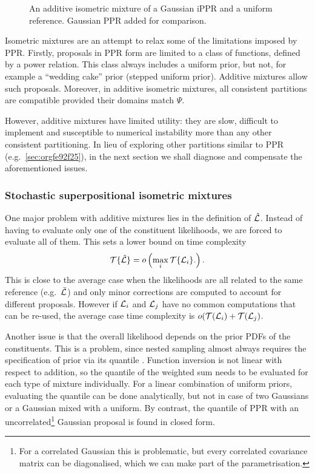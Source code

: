 \documentclass[usenatbib]{mnras}
\begin{document}
\begin{figure}
  
  \caption{\label{fig:additive} An additive isometric mixture of a
    Gaussian iPPR and a uniform reference. Gaussian PPR added for comparison.}
\end{figure}

Isometric mixtures are an attempt to relax some of the limitations
imposed by PPR. Firstly, proposals in PPR form are limited to a class
of functions, defined by a power relation. This class always includes
a uniform prior, but not, for example a ``wedding cake'' prior
(stepped uniform prior). Additive mixtures allow such
proposals. Moreover, in additive isometric mixtures, all consistent
partitions are compatible provided their domains match $\Psi$.

However, additive mixtures have limited utility: they are slow,
difficult to implement and susceptible to numerical instability more
than any other consistent partitioning. In lieu of exploring other
partitions similar to PPR (e.g.~\cref{sec:orgfe92f25}), in the next
section we shall diagnose and compensate the aforementioned issues.

\subsubsection{Stochastic superpositional isometric mixtures}

One major problem with additive mixtures lies in the definition of
$\hat{\cal L}$. Instead of having to evaluate only one of the
constituent likelihoods, we are forced to evaluate all of them. This
sets a lower bound on time complexity
\begin{equation}
  {\cal T}\{\hat{\cal L}\} = o \left(   \max_{i} {\cal T}\{ {\cal L}_{i}\}. \right).\label{eq:hard-cap}
\end{equation}
This is close to the average case when the likelihoods are all related
to the same reference (e.g.~$\bar{\cal L}$) and only minor corrections
are computed to account for different proposals. However if
${\cal L}_{i}$ and ${\cal L}_{j}$ have no common computations that can
be re-used, the average case time complexity is
\(o({\cal T}({\cal L}_{i})+ {\cal T}({\cal L}_{j})\).


Another issue is that the overall likelihood depends on the prior PDFs
of the constituents. This is a problem, since nested sampling almost
always requires the specification of prior via its quantile
\cite{Skilling2006,polychord,multinest}. Function inversion is not
linear with respect to addition, so the quantile of the weighted sum
needs to be evaluated for each type of mixture individually. For a
linear combination of uniform priors, evaluating the quantile can be
done analytically, but not in case of two Gaussians or a Gaussian
mixed with a uniform. By contrast, the quantile of PPR with an
uncorrelated\footnote{For a correlated Gaussian this is problematic,
  but every correlated covariance matrix can be diagonalised, which we
  can make part of the parametrisation.} Gaussian proposal is found in
closed form.
\end{document}
